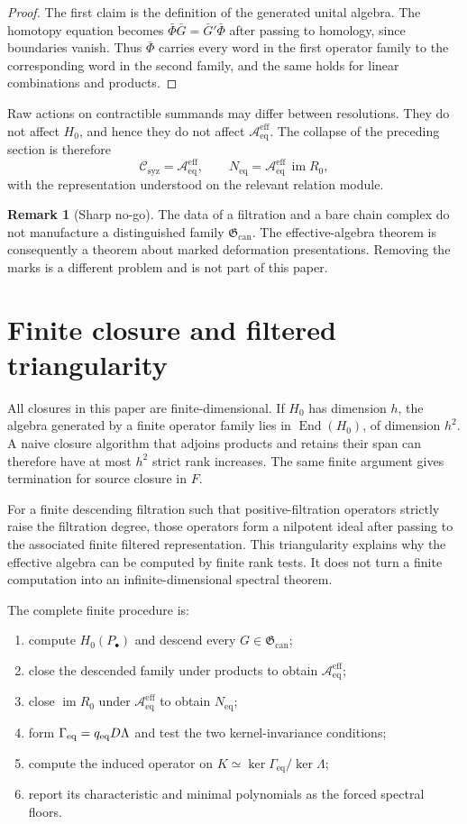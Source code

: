 \documentclass[11pt]{article}
\theoremstyle{definition}
\newtheorem{remark}[theorem]{Remark}
\newcommand{\im}{\operatorname{im}}
\newcommand{\End}{\operatorname{End}}
\newcommand{\Aeff}{\mathscr A_{\mathrm{eq}}^{\mathrm{eff}}}
\newcommand{\Neq}{N_{\mathrm{eq}}}
\newcommand{\Geq}{\Gamma_{\mathrm{eq}}}
\newcommand{\Gcan}{\mathfrak G_{\mathrm{can}}}
\newcommand{\Csyz}{\mathscr C_{\mathrm{syz}}}
\begin{document}
\begin{proof}
The first claim is the definition of the generated unital algebra. The homotopy equation becomes
\(\bar\Phi\bar G=\bar G'\bar\Phi\) after passing to homology, since boundaries vanish. Thus
\(\bar\Phi\) carries every word in the first operator family to the corresponding word in the
second family, and the same holds for linear combinations and products.
\end{proof}

Raw actions on contractible summands may differ between resolutions. They do not affect \(H_0\),
and hence they do not affect \(\Aeff\). The collapse of the preceding section is therefore
\[
\Csyz=\Aeff,
\qquad
\Neq=\Aeff\,\im R_0,
\]
with the representation understood on the relevant relation module.

\begin{remark}[Sharp no-go]
The data of a filtration and a bare chain complex do not manufacture a distinguished family
\(\Gcan\). The effective-algebra theorem is consequently a theorem about marked deformation
presentations. Removing the marks is a different problem and is not part of this paper.
\end{remark}

\section{Finite closure and filtered triangularity}

All closures in this paper are finite-dimensional. If \(H_0\) has dimension \(h\), the algebra
generated by a finite operator family lies in \(\End(H_0)\), of dimension \(h^2\). A naive closure
algorithm that adjoins products and retains their span can therefore have at most \(h^2\) strict
rank increases. The same finite argument gives termination for source closure in \(F\).

For a finite descending filtration such that positive-filtration operators strictly raise the
filtration degree, those operators form a nilpotent ideal after passing to the associated finite
filtered representation.
This triangularity explains why the effective algebra can be computed by finite rank tests. It does
not turn a finite computation into an infinite-dimensional spectral theorem.

The complete finite procedure is:
\begin{enumerate}[leftmargin=2em]
\item compute \(H_0(P_\bullet)\) and descend every \(G\in\Gcan\);
\item close the descended family under products to obtain \(\Aeff\);
\item close \(\im R_0\) under \(\Aeff\) to obtain \(\Neq\);
\item form \(\Geq=q_{\rm eq}D\Lambda\) and test the two kernel-invariance conditions;
\item compute the induced operator on \(K\simeq\ker\Geq/\ker\Lambda\);
\item report its characteristic and minimal polynomials as the forced spectral floors.
\end{enumerate}
\end{document}
